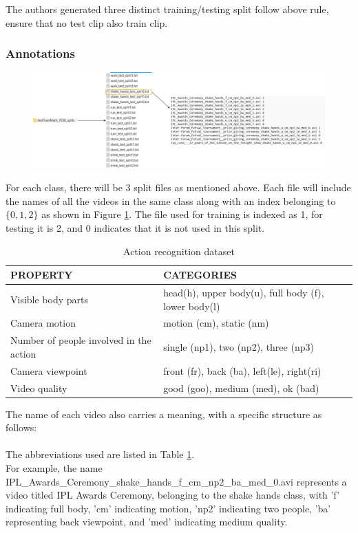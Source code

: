 \documentclass[10pt,onecolumn,letterpaper]{article}
\begin{document}
The authors generated three distinct training/testing split follow above rule,
ensure that no test clip also train clip.

\subsubsection{\textbf{Annotations}}

\begin{figure}[h]
	\centering
	\includegraphics[width=1.\linewidth]{"fig_info/fig2/Untitled Diagram.drawio"}
	\caption{}
	\label{fig:untitled-diagram}
\end{figure}

For each class, there will be 3 split files as mentioned above. Each file will
include the names of all the videos in the same class along with an index
belonging to $\lbrace 0, 1, 2 \rbrace$ as shown in Figure
\ref{fig:untitled-diagram}. The file used for training is indexed as 1, for
testing it is 2, and 0 indicates that it is not used in this split.

\begin{table}[h]
	\centering
	\caption{Action recognition dataset}
	\begin{tabular}{l | l     }
		\toprule
		PROPERTY & CATEGORIES \\
		\midrule
		Visible body parts & head(h), upper body(u), full body (f), lower body(l)\\ 
		Camera motion & motion (cm), static (nm) \\
		Number of people involved in the action	& single (np1), two (np2), three
		(np3)\\
		Camera viewpoint & front (fr), back (ba), left(le), right(ri) \\
		Video quality & good (goo), medium (med), ok (bad)	\\
		
		
		\bottomrule
	\end{tabular}%
	\label{config2}
\end{table}%

The name of each video also carries a meaning, with a specific structure as
follows: \\
\\
The abbreviations used are listed in Table \ref{config2}. \\
For example, the name
IPL\_Awards\_Ceremony\_shake\_hands\_f\_cm\_np2\_ba\_med\_0.avi represents a
video titled IPL Awards Ceremony, belonging to the shake hands class, with 'f'
indicating full body, 'cm' indicating motion, 'np2' indicating two people, 'ba'
representing back viewpoint, and 'med' indicating medium quality.
\end{document}
